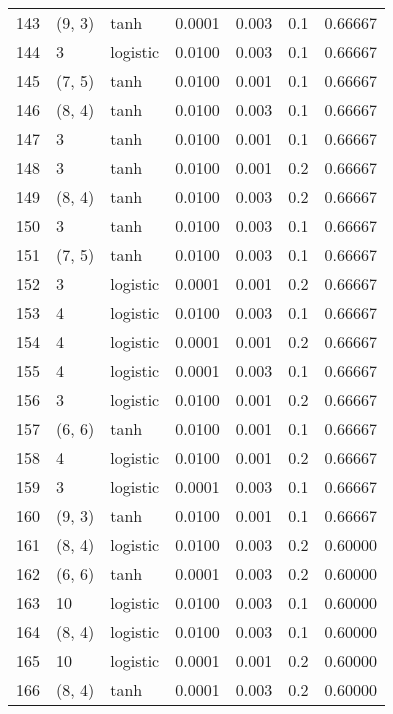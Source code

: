 \begin{tabular}{lllrrrr}
143 &      (9, 3) &      tanh &  0.0001 &  0.003 &  0.1 &   0.66667 \\
144 &           3 &  logistic &  0.0100 &  0.003 &  0.1 &   0.66667 \\
145 &      (7, 5) &      tanh &  0.0100 &  0.001 &  0.1 &   0.66667 \\
146 &      (8, 4) &      tanh &  0.0100 &  0.003 &  0.1 &   0.66667 \\
147 &           3 &      tanh &  0.0100 &  0.001 &  0.1 &   0.66667 \\
148 &           3 &      tanh &  0.0100 &  0.001 &  0.2 &   0.66667 \\
149 &      (8, 4) &      tanh &  0.0100 &  0.003 &  0.2 &   0.66667 \\
150 &           3 &      tanh &  0.0100 &  0.003 &  0.1 &   0.66667 \\
151 &      (7, 5) &      tanh &  0.0100 &  0.003 &  0.1 &   0.66667 \\
152 &           3 &  logistic &  0.0001 &  0.001 &  0.2 &   0.66667 \\
153 &           4 &  logistic &  0.0100 &  0.003 &  0.1 &   0.66667 \\
154 &           4 &  logistic &  0.0001 &  0.001 &  0.2 &   0.66667 \\
155 &           4 &  logistic &  0.0001 &  0.003 &  0.1 &   0.66667 \\
156 &           3 &  logistic &  0.0100 &  0.001 &  0.2 &   0.66667 \\
157 &      (6, 6) &      tanh &  0.0100 &  0.001 &  0.1 &   0.66667 \\
158 &           4 &  logistic &  0.0100 &  0.001 &  0.2 &   0.66667 \\
159 &           3 &  logistic &  0.0001 &  0.003 &  0.1 &   0.66667 \\
160 &      (9, 3) &      tanh &  0.0100 &  0.001 &  0.1 &   0.66667 \\
161 &      (8, 4) &  logistic &  0.0100 &  0.003 &  0.2 &   0.60000 \\
162 &      (6, 6) &      tanh &  0.0001 &  0.003 &  0.2 &   0.60000 \\
163 &          10 &  logistic &  0.0100 &  0.003 &  0.1 &   0.60000 \\
164 &      (8, 4) &  logistic &  0.0100 &  0.003 &  0.1 &   0.60000 \\
165 &          10 &  logistic &  0.0001 &  0.001 &  0.2 &   0.60000 \\
166 &      (8, 4) &      tanh &  0.0001 &  0.003 &  0.2 &   0.60000 \\

\end{tabular}
